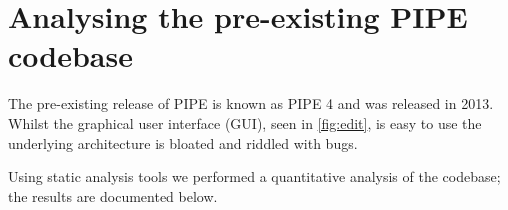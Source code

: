 \section{Analysing the pre-existing PIPE codebase}
The pre-existing release of PIPE is known as PIPE 4 and was released in 2013. Whilst the graphical user interface (GUI), seen in \cref{fig:edit}, is easy to use the underlying architecture is bloated and riddled with bugs.

Using static analysis tools we performed a quantitative analysis of the codebase; the  results are documented below.




